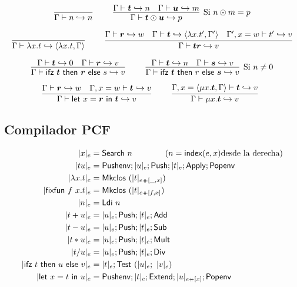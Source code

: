 \documentclass[twoside,a4paper,12pt]{article}
\theoremstyle{definition}
\theoremstyle{remark}
\begin{document}
\begin{equation*}
  \infer[]
    {\Gamma\vdash n \hra n}
    {}
  \qquad
  \infer[\textrm{Si }n\odot m=p]
    {\Gamma\vdash \bm t \odot \bm u \hra p}
    {\Gamma\vdash \bm t \hra n & \Gamma\vdash \bm u \hra m }
\end{equation*}

\begin{equation*}
  \infer[]
    {\Gamma\vdash\fun xt\hra\thunk {\fun xt}\Gamma}
    {}
  \qquad
  \infer
    {\Gamma\vdash \bm{t} \bm{r} \hra v}
    {
      \Gamma\vdash \bm r \hra w
      &\Gamma\vdash \bm t \hra\thunk {\fun x{t'}}{\Gamma'}
      &\Gamma',x=w\vdash t'\hra v
    }
\end{equation*}

\begin{equation*}
  \infer[]
    {\Gamma\vdash \ifz{\bm t}{\bm r}{s}\hra v}
    {
      \Gamma\vdash  \bm t \hra 0
      &\Gamma\vdash \bm r \hra v
    }
    \qquad
    \infer[\textrm{Si }n\neq 0]
      {\Gamma\vdash \ifz{\bm t}{r}{\bm s} \hra v}
      {
        \Gamma\vdash  \bm t \hra n
        &\Gamma\vdash \bm s \hra v
      }
\end{equation*}

\begin{equation*}
  \infer[]
    {\Gamma\vdash\letl{x}{\bm r}{\bm t} \hra v}
    {
      \Gamma\vdash \bm r \hra w
      &\Gamma,x=w\vdash \bm t \hra v
    }
    \qquad
    \infer[]
      {\Gamma \vdash \fix x{\bm t} \hra v}
      {\Gamma,x=\thunk{\fix x{\bm t}}\Gamma\vdash \bm t \hra v}
\end{equation*}

\newpage
\subsection*{Compilador PCF}

\begin{align*}
  |x|_e           &= \Search n \qquad\qquad (n = \s{index}(e, x) \text{desde la derecha})\\
  |tu|_e          &= \Pushenv;  |u|_e; \Push;  |t|_e;  \Apply;  \Popenv\\
  |\fun xt|_e     &= \Mkclos {|t|_{e\concats[\_,x]}} \\
  |\fixfun fxt|_e &= \Mkclos {|t|_{e\concats[f,x]}}  \\
  |n|_e           &= \Ldi n \\
  |t+u|_e         &= |u|_e; \Push; |t|_e; \Add\\
  |t-u|_e         &= |u|_e; \Push; |t|_e; \Sub\\
  |t*u|_e         &= |u|_e; \Push; |t|_e; \Mult\\
  |t / u|_e       &= |u|_e; \Push; |t|_e; \Div\\
  |\ifz tuv|_e    &= |t|_e; \Test {|u|_e} {|v|_e}\\
  |\letl xtu|_e   &= \Pushenv;  |t|_e;  \Extend;  |u|_{e\concats [x]};  \Popenv
\end{align*}
\end{document}
